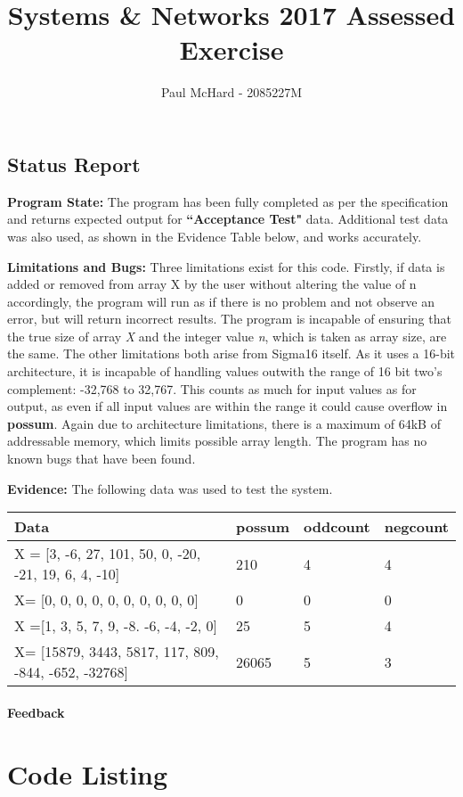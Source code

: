 \documentclass[10pt, oneside]{article}
\title{\vspace{-1.6cm}Systems \& Networks 2017 Assessed Exercise}
\author{Paul McHard - 2085227M}
\date{\displaydate{date}}
\begin{document}
\maketitle
\subsection*{Status Report}
\textbf{Program State:} The program has been fully completed as per the specification and returns expected output for \textbf{``Acceptance Test"} data. Additional test data was also used, as shown in the Evidence Table below, and works accurately. 

\textbf{Limitations and Bugs: }Three limitations exist for this code. Firstly, if data is added or removed from array X by the user without altering the value of n accordingly, the program will run as if there is no problem and not observe an error, but will return incorrect results. The program is incapable of ensuring that the true size of array \textit{X} and the integer value \textit{n}, which is taken as array size, are the same. The other limitations both arise from Sigma16 itself. As it uses a 16-bit architecture, it is incapable of handling values outwith the range of 16 bit two's complement: -32,768 to 32,767. This counts as much for input values as for output, as even if all input values are within the range it could cause overflow in \textbf{possum}. Again due to architecture limitations, there is a maximum of 64kB of addressable memory, which limits possible array length. The program has no known bugs that have been found.

\textbf{Evidence: }	The following data was used to test the system.
\begin{center}
\begin{tabular}{ | m{8cm} | m{2cm}| m{2cm} | m{2cm} | } 
 \hline
 \textbf{Data} & \textbf{possum} & \textbf{oddcount} & \textbf{negcount} \\ 
  \hline
X = [3, -6, 27, 101, 50, 0, -20, -21, 19, 6, 4, -10]  & 210 & 4 & 4\\ 
  \hline
 X= [0, 0, 0, 0, 0, 0, 0, 0, 0, 0] & 0 & 0 & 0 \\ 
 \hline
 X =[1, 3, 5, 7, 9, -8. -6, -4, -2, 0] & 25 & 5 & 4 \\
 \hline
 X= [15879, 3443, 5817, 117, 809, -844, -652, -32768] & 26065 & 5 & 3\\
 \hline
\end{tabular}
\end{center}
\paragraph{Feedback}
\newpage
\section*{Code Listing}

\end{document}

